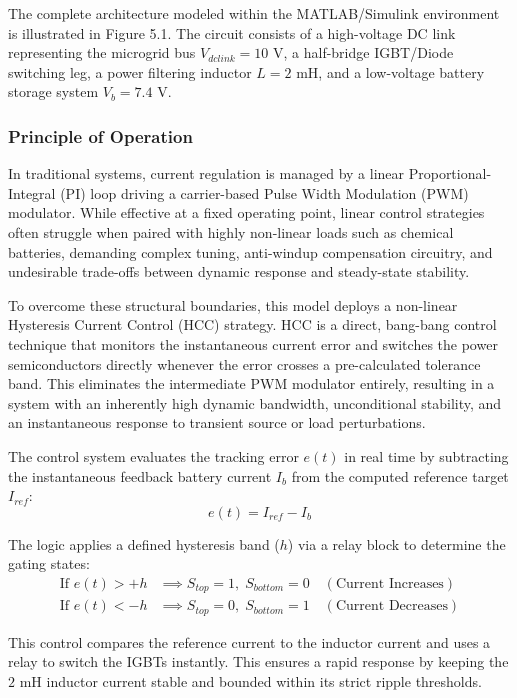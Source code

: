 The complete architecture modeled within the MATLAB/Simulink environment is illustrated in Figure 5.1. The circuit consists of a high-voltage DC link representing the microgrid bus $V_{dclink} = 10\text{ V}$, a half-bridge IGBT/Diode switching leg, a power filtering inductor $L = 2\text{ mH}$, and a low-voltage battery storage system $V_{b} = 7.4\text{ V}$.

\subsubsection{Principle of Operation}
In traditional systems, current regulation is managed by a linear Proportional-Integral (PI) loop driving a carrier-based Pulse Width Modulation (PWM) modulator. While effective at a fixed operating point, linear control strategies often struggle when paired with highly non-linear loads such as chemical batteries, demanding complex tuning, anti-windup compensation circuitry, and undesirable trade-offs between dynamic response and steady-state stability.

To overcome these structural boundaries, this model deploys a non-linear Hysteresis Current Control (HCC) strategy. HCC is a direct, bang-bang control technique that monitors the instantaneous current error and switches the power semiconductors directly whenever the error crosses a pre-calculated tolerance band. This eliminates the intermediate PWM modulator entirely, resulting in a system with an inherently high dynamic bandwidth, unconditional stability, and an instantaneous response to transient source or load perturbations.

The control system evaluates the tracking error $e(t)$ in real time by subtracting the instantaneous feedback battery current $I_{b}$ from the computed reference target $I_{ref}$:
\begin{equation}
    e(t) = I_{ref} - I_{b}
\end{equation}

The logic applies a defined hysteresis band ($h$) via a relay block to determine the gating states:
\begin{align}
    \text{If } e(t) > +h &\implies S_{top} = 1,\; S_{bottom} = 0 \quad (\text{Current Increases}) \\
    \text{If } e(t) < -h &\implies S_{top} = 0,\; S_{bottom} = 1 \quad (\text{Current Decreases})
\end{align}

This control compares the reference current to the inductor current and uses a relay to switch the IGBTs instantly. This ensures a rapid response by keeping the $2\text{ mH}$ inductor current stable and bounded within its strict ripple thresholds.

